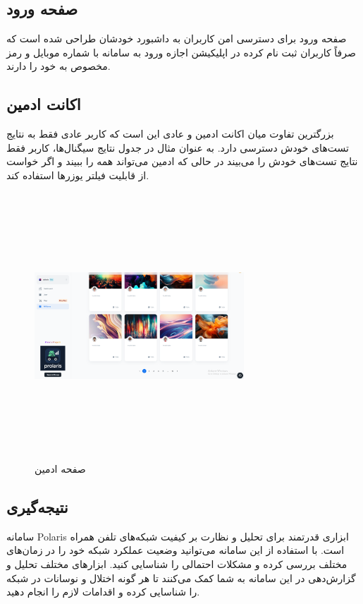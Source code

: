 \documentclass{report}
\begin{document}
\subsection{صفحه ورود}
صفحه ورود برای دسترسی امن کاربران به داشبورد خودشان طراحی شده است که صرفاً کاربران ثبت نام کرده در اپلیکیشن اجازه ورود به سامانه با شماره موبایل و رمز مخصوص به خود را دارند. 

\subsection{اکانت ادمین}
بزرگترین تفاوت میان اکانت ادمین و عادی این است که کاربر عادی فقط به نتایج تست‌های خودش دسترسی دارد. به عنوان مثال در جدول نتایج سیگنال‌ها، کاربر فقط نتایج تست‌های خودش را می‌بیند در حالی که ادمین می‌تواند همه را ببیند و اگر خواست از قابلیت فیلتر یوزر‌ها استفاده کند.
\begin{figure}[ht]
	\centering
	\includegraphics[width=0.7\textwidth,height=10cm,keepaspectratio]{Pic/admin}
	\caption{صفحه ادمین}
	\label{fig:admin}
\end{figure}
\subsection{نتیجه‌گیری}
سامانه Polaris ابزاری قدرتمند برای تحلیل و نظارت بر کیفیت شبکه‌های تلفن همراه است. با استفاده از این سامانه می‌توانید وضعیت عملکرد شبکه خود را در زمان‌های مختلف بررسی کرده و مشکلات احتمالی را شناسایی کنید. ابزارهای مختلف تحلیل و گزارش‌دهی در این سامانه به شما کمک می‌کنند تا هر گونه اختلال و نوسانات در شبکه را شناسایی کرده و اقدامات لازم را انجام دهید.
\end{document}
